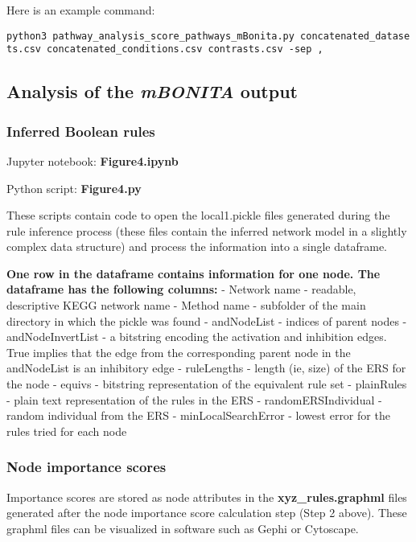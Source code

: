 \documentclass[]{article}
\begin{document}
Here is an example command:

\texttt{python3\ pathway\_analysis\_score\_pathways\_mBonita.py\ concatenated\_datasets.csv\ concatenated\_conditions.csv\ contrasts.csv\ -sep\ ,}

\hypertarget{analysis-of-the-mbonita-output}{%
\subsection{\texorpdfstring{Analysis of the \emph{mBONITA}
output}{Analysis of the mBONITA output}}\label{analysis-of-the-mbonita-output}}

\hypertarget{inferred-boolean-rules}{%
\subsubsection{Inferred Boolean rules}\label{inferred-boolean-rules}}

Jupyter notebook: \textbf{Figure4.ipynb}

Python script: \textbf{Figure4.py}

These scripts contain code to open the local1.pickle files generated
during the rule inference process (these files contain the inferred
network model in a slightly complex data structure) and process the
information into a single dataframe.

\textbf{One row in the dataframe contains information for one node. The
dataframe has the following columns:} - Network name - readable,
descriptive KEGG network name - Method name - subfolder of the main
directory in which the pickle was found - andNodeList - indices of
parent nodes - andNodeInvertList - a bitstring encoding the activation
and inhibition edges. True implies that the edge from the corresponding
parent node in the andNodeList is an inhibitory edge - ruleLengths -
length (ie, size) of the ERS for the node - equivs - bitstring
representation of the equivalent rule set - plainRules - plain text
representation of the rules in the ERS - randomERSIndividual - random
individual from the ERS - minLocalSearchError - lowest error for the
rules tried for each node

\hypertarget{node-importance-scores}{%
\subsubsection{Node importance scores}\label{node-importance-scores}}

Importance scores are stored as node attributes in the
\textbf{xyz\_rules.graphml} files generated after the node importance
score calculation step (Step 2 above). These graphml files can be
visualized in software such as Gephi or Cytoscape.
\end{document}
